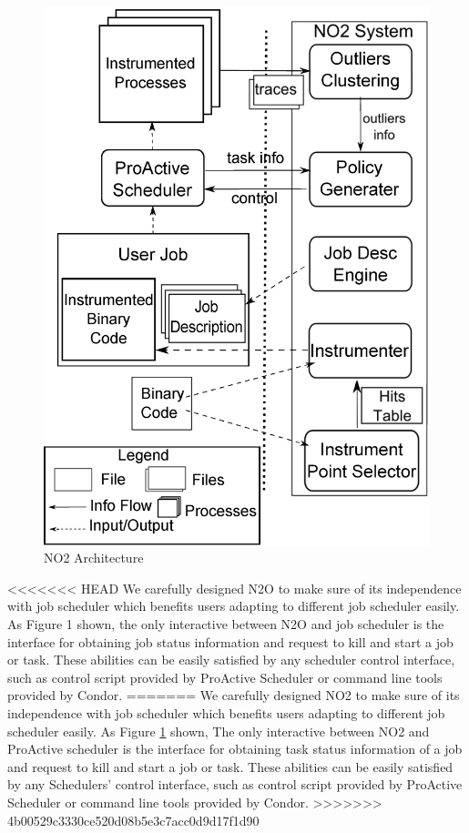 \begin{figure}
\centering
\includegraphics[width=0.9\columnwidth]{figures/NO2_arch.eps}
\caption{NO2 Architecture}
\label{figure:no2arch}
\end{figure}

<<<<<<< HEAD
We carefully designed N2O to make sure of its independence with job scheduler which benefits users adapting to different job scheduler easily. As Figure 1 shown, the only interactive between N2O and job scheduler is the interface for obtaining job status information and request to kill and start a job or task. These abilities can be easily satisfied by any scheduler control interface, such as control script provided by ProActive Scheduler or command line tools provided by Condor.
=======
We carefully designed NO2 to make sure of its independence with job scheduler which benefits users adapting to different job scheduler easily. As Figure \ref{figure:no2arch} shown, The only interactive between NO2 and ProActive scheduler is the interface for obtaining task status information of a job and request to kill and start a job or task. These abilities can be easily satisfied by any Schedulers' control interface, such as control script provided by ProActive Scheduler or command line tools provided by Condor. 
>>>>>>> 4b00529c3330ce520d08b5e3c7acc0d9d17f1d90

